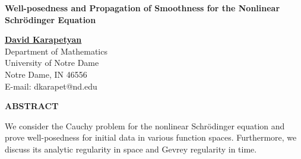 \renewcommand\floatpagefraction{0.9}
\renewcommand{\baselinestretch}{1.}
\topmargin 0.3in
\newcommand{\marg}[1]{\marginpar{\raggedright\scriptsize#1}}
\parskip=10pt
\setlength{\textwidth}{6.5in}
\setlength{\textheight}{8.5in}
\setlength{\evensidemargin}{0.0in}
\setlength{\oddsidemargin}{0.0in}

\pagestyle{empty}
\begin{center}
\begin{large}
{\bf Well-posedness and Propagation of Smoothness for
the Nonlinear Schr\"odinger Equation}
\end{large}
\end{center}

\vskip0.4in
\begin{center}
{\large \bf\underline{David Karapetyan}} \\
Department of Mathematics\\
University of Notre Dame\\
Notre Dame, IN 46556\\
E-mail: dkarapet@nd.edu\\
\end{center}



\bigskip
\centerline {{\bf ABSTRACT}}
\bigskip
\noindent
We consider the Cauchy problem for the nonlinear Schr{\"o}dinger equation and
prove well-posedness for initial data in various function spaces. Furthermore,
we discuss its analytic regularity in space and Gevrey regularity in time.



